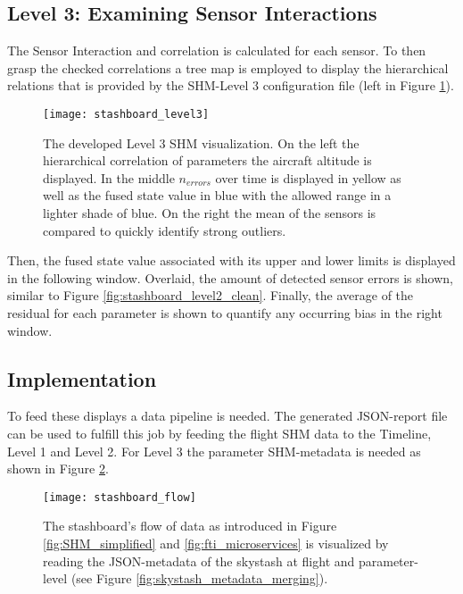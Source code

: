 \subsection{Level 3: Examining Sensor Interactions}
The Sensor Interaction and correlation is calculated for each sensor. To then grasp the checked correlations a tree map is employed to display the hierarchical relations that is provided by the SHM-Level 3 configuration file (left in Figure \ref{fig:stashboard_level3}).

\begin{figure}
    \centering
    \texttt{[image: stashboard\_level3]}
    \caption[Stashboard: Level 3 hierarchical configuration and fused state over time with detection range]{The developed Level 3 SHM visualization. On the left the hierarchical correlation of parameters the aircraft altitude is displayed. In the middle $n_{errors}$ over time is displayed in yellow as well as the fused state value in blue with the allowed range in a lighter shade of blue. On the right the mean of the sensors is compared to quickly identify strong outliers.}
    \label{fig:stashboard_level3}
\end{figure}

Then, the fused state value associated with its upper and lower limits is displayed in the following window. Overlaid, the amount of detected sensor errors is shown, similar to Figure \ref{fig:stashboard_level2_clean}. Finally, the average of the residual for each parameter is shown to quantify any occurring bias in the right window.


\subsection{Implementation}
To feed these displays a data pipeline is needed. The generated JSON-report file can be used to fulfill this job by feeding the flight SHM data to the Timeline, Level 1 and Level 2. For Level 3 the parameter SHM-metadata is needed as shown in Figure \ref{fig:stashboard_flow}.

\begin{figure}[!h]
    \centering
    \texttt{[image: stashboard\_flow]}
    \caption[Stashboard: Visualization data flow]{The stashboard's flow of data as introduced in Figure \ref{fig:SHM_simplified} and \ref{fig:fti_microservices} is visualized by reading the JSON-metadata of the skystash at flight and parameter-level (see Figure \ref{fig:skystash_metadata_merging}). }
    \label{fig:stashboard_flow}
\end{figure}





